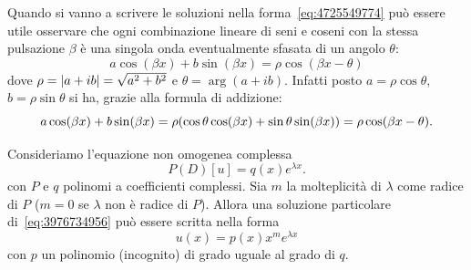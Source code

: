\begin{remark}
Quando si vanno a scrivere le soluzioni
nella forma~\eqref{eq:4725549774} può essere utile osservare
che ogni combinazione lineare di seni e coseni
con la stessa pulsazione $\beta$ è una singola onda
eventualmente sfasata di un angolo $\theta$:
\[
  a \cos (\beta x) + b \sin (\beta x)
  =
  \rho \cos(\beta x - \theta)
\]
dove $\rho = {\left|a+ib\right|} = \sqrt{a^2+b^2}$ e $\theta=\arg(a+ib)$. Infatti
posto $a=\rho\cos \theta$, $b=\rho \sin \theta$ si ha,
grazie alla formula di addizione:
\[
   a \cos (\beta x) + b \sin (\beta x)
   = \rho{\left( \cos \theta \cos(\beta x) + \sin \theta \sin (\beta x) \right)}
   = \rho \cos(\beta x - \theta).
\]
\end{remark}

\begin{theorem}
\mymark{***}
Consideriamo l'equazione non omogenea complessa
\begin{equation}\label{eq:3976734956}
 P(D) [u] = q(x) e^{\lambda x}.
\end{equation}
con $P$ e $q$ polinomi a coefficienti complessi.
Sia $m$ la molteplicità di $\lambda$ come radice di $P$ ($m=0$ se $\lambda$ non è radice di $P$).
Allora una soluzione particolare di~\eqref{eq:3976734956} può essere scritta nella forma
\begin{equation}
\label{eq:945396}
u(x) = p(x) x^m e^{\lambda x}
\end{equation}
con $p$ un polinomio (incognito) di grado uguale al grado di $q$.
\end{theorem}
%
